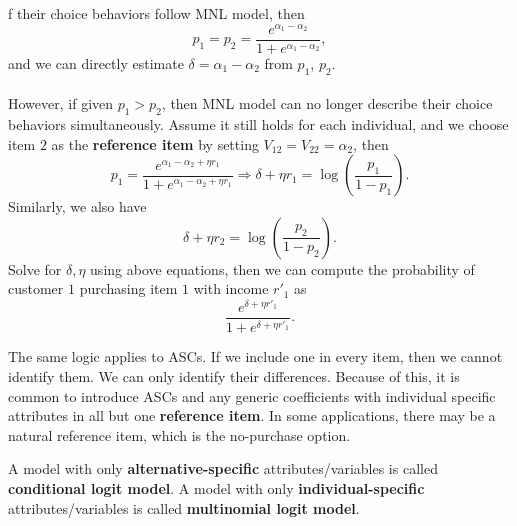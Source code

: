 \documentclass[11pt]{article}
\newenvironment{example}[2][Example]{\begin{trivlist}
\item[\hskip \labelsep {\bfseries #1}\hskip \labelsep {\bfseries #2.}]}{\end{trivlist}}
\begin{document}
\begin{enumerate}
\begin{example}[Example]
If their choice behaviors follow MNL model, then 
\begin{equation*}
p_1 = p_2 = \frac{e^{\alpha_1-\alpha_2}}{1+e^{\alpha_1-\alpha_2}},
\end{equation*}
and we can directly estimate $\delta = \alpha_1 - \alpha_2$ from $p_1$, $p_2$. \\ \\
However, if given $p_1 > p_2$, then MNL model can no longer describe their choice behaviors simultaneously. Assume it still holds for each individual, and we choose item $2$ as the \textbf{reference item} by setting $V_{12} = V_{22} = \alpha_2$, then
\begin{equation*}
p_1 = \frac{e^{\alpha_1-\alpha_2+\eta r_1}}{1+e^{\alpha_1-\alpha_2+\eta r_1}} \Rightarrow \delta+\eta r_1 = \log(\frac{p_1}{1-p_1}).
\end{equation*}
Similarly, we also have
\begin{equation*}
\delta+\eta r_2 = \log(\frac{p_2}{1-p_2}).
\end{equation*}
Solve for $\delta, \eta$ using above equations, then we can compute the probability of customer $1$ purchasing item $1$ with income $r'_1$ as
\begin{equation*}
\frac{e^{\delta + \eta r'_1}}{1+e^{\delta + \eta r'_1}}.
\end{equation*}
\end{example}
\item The same logic applies to ASCs. If we include one in every item, then we cannot identify them. We can only identify their differences. Because of this, it is common to introduce ASCs and any generic coefficients with individual specific attributes in all but one \textbf{reference item}. In some applications, there may be a natural reference item, which is the no-purchase option.
\item A model with only \textbf{alternative-specific} attributes/variables is called \textbf{conditional logit model}. A model with only \textbf{individual-specific} attributes/variables is called \textbf{multinomial logit model}.
\end{enumerate}
\end{document}
